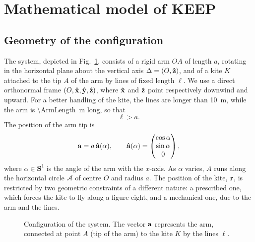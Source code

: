 \section{Mathematical model of KEEP} \label{sec:model}

\subsection{Geometry of the configuration} \label{sec:model-geometry}

The system, depicted in Fig.~\ref{fig:config}, consists of a rigid arm \(OA\) of length \(a\), rotating in the horizontal plane about the vertical axis \(\Delta = (O,\vu z)\), and of a kite \(K\) attached to the tip \(A\) of the arm by lines of fixed length \(\ell\).
We use a direct orthonormal frame \((O,\vu x,\vu y,\vu z)\), where \(\vu x\) and \(\vu z\) point respectively downwind and upward.
For a better handling of the kite, the lines are longer than \SI{10}{\meter}, while the arm is \SI{\ArmLength}{\meter} long, so that
\begin{equation} \label{eq:ineq-l-a}
    \ell > a.
\end{equation}
The position of the arm tip is
\begin{equation}
    \vb a = a\,\vu a(\alpha), \qquad \vu a(\alpha) = \begin{pmatrix} \cos\alpha \\ \sin\alpha \\ 0 \end{pmatrix},
\end{equation}
where \(\alpha\in\mathbf{S}^1\) is the angle of the arm with the \(x\)-axis.
As \(\alpha\) varies, \(A\) runs along the horizontal circle \(\mathscr{A}\) of centre \(O\) and radius \(a\).
The position of the kite, \(\vb r\), is restricted by two geometric constraints of a different nature: a prescribed one, which forces the kite to fly along a figure eight, and a mechanical one, due to the arm and the lines.

\begin{figure}
  \centering
  
  \caption{Configuration of the system. The vector $\vb a$ represents the arm, connected at point $A$ (tip of the arm) to the kite $K$ by the lines $\boldsymbol{\ell}$.}
  \label{fig:config}
\end{figure}

